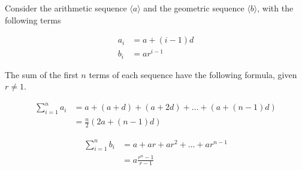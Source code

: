 \vspace{\baselineskip}
\begin{theorem}
	Consider the arithmetic sequence $\langle a \rangle$ and the geometric sequence $\langle b \rangle$, with the following terms
	
	\begin{align*}
		a_i &= a + (i - 1)d \\
		b_i &= a r^{i - 1}
	\end{align*}
	
	The sum of the first $n$ terms of each sequence have the following formula, given $r \neq 1$.
	
	\begin{align}
		\sum_{i = 1}^n a_i &=  a + (a + d) + (a + 2d) + \dots + (a + (n - 1)d) \\
		&= \frac{n}{2} \left( 2a + (n - 1)d \right)
	\end{align}
	
	\begin{align}
		\sum_{i = 1}^n b_i &=  a + ar + ar^2 + \dots + ar^{n - 1} \\
		&= a \frac{r^n - 1}{r - 1}
	\end{align}
\end{theorem}
